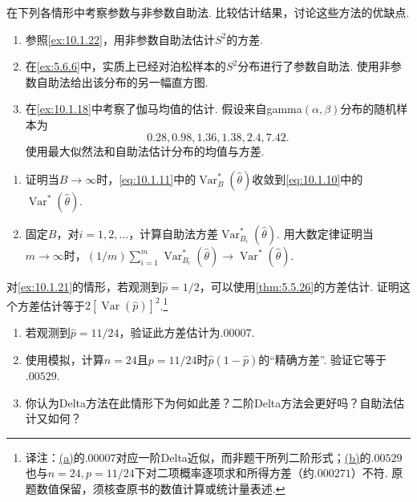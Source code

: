 \begin{exercise}\label{exercise:10.14}
在下列各情形中考察参数与非参数自助法. 比较估计结果，讨论这些方法的优缺点.
\begin{enumerate}[label=(\alph*)]
\item 参照\autoref{ex:10.1.22}，用非参数自助法估计$S^2$的方差.
\item 在\autoref{ex:5.6.6}中，实质上已经对泊松样本的$S^2$分布进行了参数自助法. 使用非参数自助法给出该分布的另一幅直方图.
\item 在\autoref{ex:10.1.18}中考察了伽马均值的估计. 假设来自gamma$(\alpha,\beta)$分布的随机样本为
$$0.28,0.98,1.36,1.38,2.4,7.42.$$
使用最大似然法和自助法估计分布的均值与方差.
\end{enumerate}
\end{exercise}

\begin{exercise}\label{exercise:10.15}\leavevmode
\begin{enumerate}[label=(\alph*)]
\item 证明当$B\to\infty$时，\eqref{eq:10.1.11}中的$\operatorname{Var}_B^*(\hat\theta)$收敛到\eqref{eq:10.1.10}中的$\operatorname{Var}^*(\hat\theta)$.
\item 固定$B$，对$i=1,2,\ldots$，计算自助法方差$\operatorname{Var}_{B_i}^*(\hat\theta)$. 用大数定律证明当$m\to\infty$时，$(1/m)\sum_{i=1}^m\operatorname{Var}_{B_i}^*(\hat\theta)\to\operatorname{Var}^*(\hat\theta)$.
\end{enumerate}
\end{exercise}

\begin{exercise}\label{exercise:10.16}
对\autoref{ex:10.1.21}的情形，若观测到$\hat p=1/2$，可以使用\autoref{thm:5.5.26}的方差估计. 证明这个方差估计等于$2[\operatorname{Var}(\hat p)]^2$.\footnote{译注：\hyperref[itm:exercise:10.16:a]{(a)}的$.00007$对应一阶Delta近似，而非题干所列二阶形式；\hyperref[itm:exercise:10.16:b]{(b)}的$.00529$也与$n=24,p=11/24$下对二项概率逐项求和所得方差（约$.000271$）不符. 原题数值保留，须核查原书的数值计算或统计量表述.}
\begin{enumerate}[label=(\alph*)]
\item{}\label{itm:exercise:10.16:a} 若观测到$\hat p=11/24$，验证此方差估计为$.00007$.
\item{}\label{itm:exercise:10.16:b} 使用模拟，计算$n=24$且$p=11/24$时$\hat p(1-\hat p)$的“精确方差”. 验证它等于$.00529$.
\item 你认为Delta方法在此情形下为何如此差？二阶Delta方法会更好吗？自助法估计又如何？
\end{enumerate}
\end{exercise}

